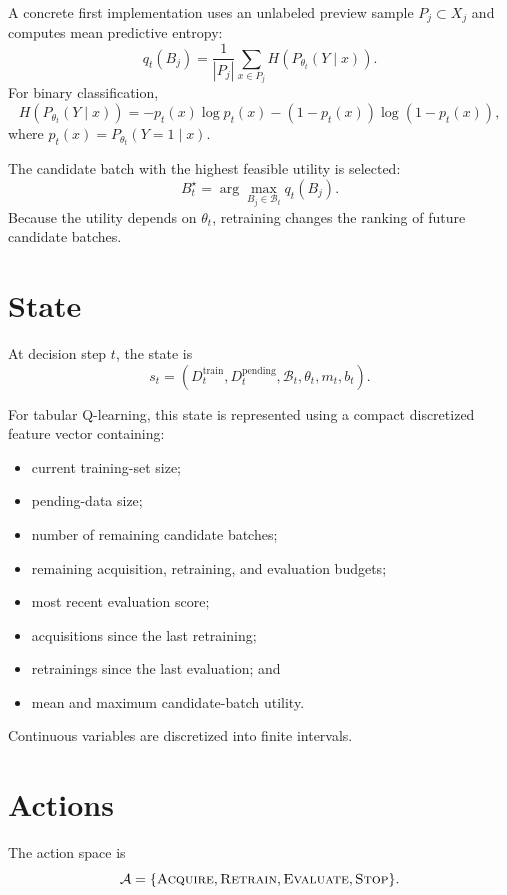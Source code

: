 \documentclass[11pt,letterpaper]{article}
\begin{document}
A concrete first implementation uses an unlabeled preview sample
\(P_j\subset X_j\) and computes mean predictive entropy:
\[
    q_t(B_j)
    =
    \frac{1}{|P_j|}
    \sum_{x\in P_j}
    H\!\left(P_{\theta_t}(Y\mid x)\right).
\]
For binary classification,
\[
    H\!\left(P_{\theta_t}(Y\mid x)\right)
    =
    -p_t(x)\log p_t(x)
    -(1-p_t(x))\log(1-p_t(x)),
\]
where \(p_t(x)=P_{\theta_t}(Y=1\mid x)\).

The candidate batch with the highest feasible utility is selected:
\[
    B_t^\star
    =
    \arg\max_{B_j\in\mathcal{B}_t}q_t(B_j).
\]
Because the utility depends on \(\theta_t\), retraining changes the ranking of
future candidate batches.

\section{State}

At decision step \(t\), the state is
\[
    s_t
    =
    \left(
        D_t^{\mathrm{train}},
        D_t^{\mathrm{pending}},
        \mathcal{B}_t,
        \theta_t,
        m_t,
        b_t
    \right).
\]

For tabular Q-learning, this state is represented using a compact discretized
feature vector containing:
\begin{itemize}[nosep]
    \item current training-set size;
    \item pending-data size;
    \item number of remaining candidate batches;
    \item remaining acquisition, retraining, and evaluation budgets;
    \item most recent evaluation score;
    \item acquisitions since the last retraining;
    \item retrainings since the last evaluation; and
    \item mean and maximum candidate-batch utility.
\end{itemize}
Continuous variables are discretized into finite intervals.

\section{Actions}

The action space is
\[
    \mathcal{A}
    =
    \{\textsc{Acquire},\textsc{Retrain},\textsc{Evaluate},\textsc{Stop}\}.
\]
\end{document}
